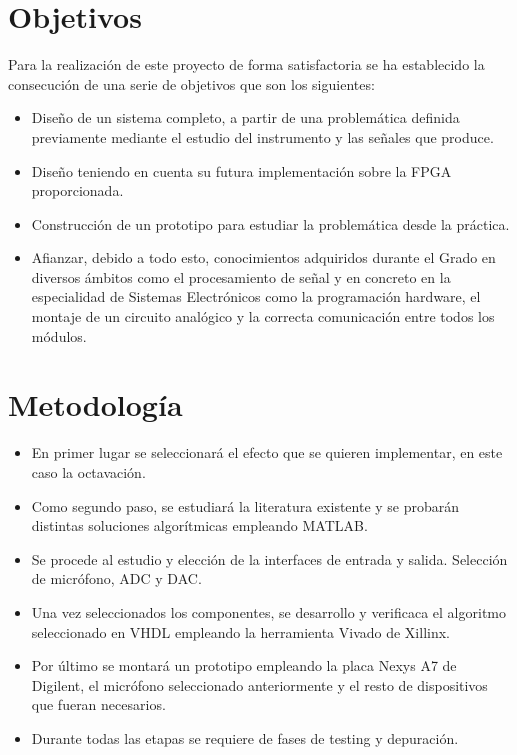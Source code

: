 \section{Objetivos}
Para la realización de este proyecto de forma satisfactoria se ha establecido la consecución de una serie de objetivos que son los siguientes:
\begin{itemize}
\item Diseño de un sistema completo, a partir de una problemática definida previamente mediante el estudio del instrumento y las señales que produce.
\item Diseño teniendo en cuenta su futura implementación sobre la FPGA proporcionada.
\item Construcción de un prototipo para estudiar la problemática desde la práctica.
\item Afianzar, debido a todo esto, conocimientos adquiridos durante el Grado en diversos ámbitos como el procesamiento de señal y en concreto en la especialidad de Sistemas Electrónicos como la programación hardware, el montaje de un circuito analógico y la correcta comunicación entre todos los módulos.
\end{itemize}

\section{Metodología}
\begin{itemize}
\item En primer lugar se seleccionará el efecto que se quieren implementar, en este caso la octavación.
\item Como segundo paso, se estudiará la literatura existente y se probarán distintas soluciones algorítmicas empleando MATLAB.
\item Se procede al estudio y elección de la interfaces de entrada y salida. Selección de micrófono, ADC y DAC.
\item Una vez seleccionados los componentes, se desarrollo y verificaca el algoritmo seleccionado en VHDL empleando la herramienta Vivado de Xillinx.
\item Por último se montará un prototipo empleando la placa Nexys A7 de Digilent, el micrófono seleccionado anteriormente y el resto de dispositivos que fueran necesarios.
\item Durante todas las etapas se requiere de fases de testing y depuración.
\end{itemize}


